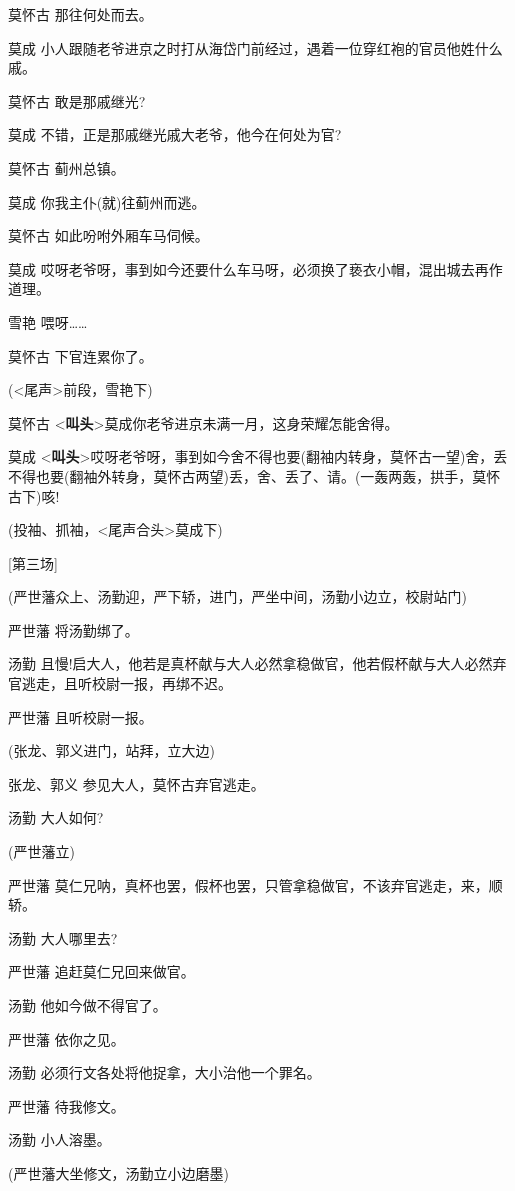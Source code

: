 莫怀古 那往何处而去。

莫成
小人跟随老爷进京之时打从海岱门前经过，遇着一位穿红袍的官员他姓什么戚。

莫怀古 敢是那戚继光?

莫成 不错，正是那戚继光戚大老爷，他今在何处为官?

莫怀古 蓟州总镇。

莫成 你我主仆(就)往蓟州而逃。

莫怀古 如此吩咐外厢车马伺候。

莫成
哎呀老爷呀，事到如今还要什么车马呀，必须换了亵衣小帽，混出城去再作道理。

雪艳 喂呀\ldots{}\ldots{}

莫怀古 下官连累你了。

(\textless{}尾声\textgreater{}前段，雪艳下)

莫怀古
\textless{}\textbf{叫头}\textgreater{}莫成你老爷进京未满一月，这身荣耀怎能舍得。

莫成
\textless{}\textbf{叫头}\textgreater{}哎呀老爷呀，事到如今舍不得也要(翻袖内转身，莫怀古一望)舍，丢不得也要(翻袖外转身，莫怀古两望)丢，舍、丢了、请。(一轰两轰，拱手，莫怀古下)咳!

(投袖、抓袖，\textless{}尾声合头\textgreater{}莫成下)

{[}第三场{]}

(严世藩众上、汤勤迎，严下轿，进门，严坐中间，汤勤小边立，校尉站门)

严世藩 将汤勤绑了。

汤勤
且慢!启大人，他若是真杯献与大人必然拿稳做官，他若假杯献与大人必然弃官逃走，且听校尉一报，再绑不迟。

严世藩 且听校尉一报。

(张龙、郭义进门，站拜，立大边)

张龙、郭义 参见大人，莫怀古弃官逃走。

汤勤 大人如何?

(严世藩立)

严世藩
莫仁兄呐，真杯也罢，假杯也罢，只管拿稳做官，不该弃官逃走，来，顺轿。

汤勤 大人哪里去?

严世藩 追赶莫仁兄回来做官。

汤勤 他如今做不得官了。

严世藩 依你之见。

汤勤 必须行文各处将他捉拿，大小治他一个罪名。

严世藩 待我修文。

汤勤 小人溶墨。

(严世藩大坐修文，汤勤立小边磨墨)

